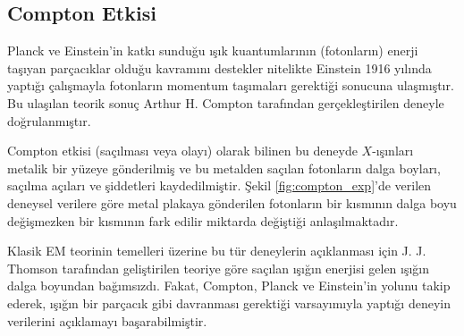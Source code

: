 \documentclass[a4paper,12pt, twoside]{article}
\begin{document}
\subsection{Compton Etkisi}
Planck ve Einstein'in katkı sunduğu ışık kuantumlarının (fotonların) enerji taşıyan parçacıklar olduğu kavramını destekler nitelikte Einstein 1916 yılında yaptığı çalışmayla fotonların momentum taşımaları gerektiği sonucuna ulaşmıştır. Bu ulaşılan teorik sonuç Arthur H. Compton tarafından gerçekleştirilen deneyle doğrulanmıştır.

Compton etkisi (saçılması veya olayı) olarak bilinen bu deneyde $X$-ışınları metalik bir yüzeye gönderilmiş ve bu metalden saçılan fotonların dalga boyları, saçılma açıları ve şiddetleri kaydedilmiştir. Şekil \ref{fig:compton_exp}'de verilen deneysel verilere göre metal plakaya gönderilen fotonların bir kısmının dalga boyu değişmezken bir kısmının fark edilir miktarda değiştiği anlaşılmaktadır.

Klasik EM teorinin temelleri üzerine bu tür deneylerin açıklanması için J. J. Thomson \cite{Thomson1906}  tarafından geliştirilen teoriye göre saçılan ışığın enerjisi gelen ışığın dalga boyundan bağımsızdı. Fakat, Compton, Planck ve Einstein'in yolunu takip ederek, ışığın bir parçacık gibi davranması gerektiği varsayımıyla yaptığı deneyin verilerini açıklamayı başarabilmiştir.
\end{document}
